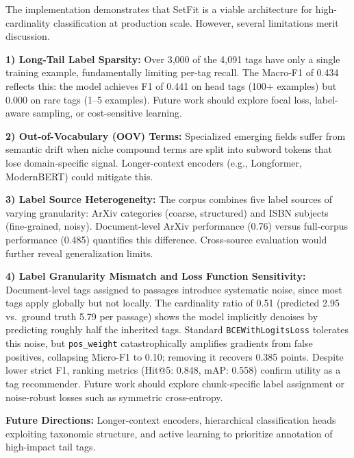 \documentclass[10pt,journal,compsoc]{IEEEtran}
\newcommand{\NumTags}{4,091}
\newcommand{\MicroF}{0.485}
\newcommand{\MacroF}{0.434}
\newcommand{\ArXivMicroF}{0.76}
\newcommand{\PosWeightMicroF}{0.10}
\newcommand{\PosWeightDelta}{0.385}
\newcommand{\HitRateFive}{0.848}
\newcommand{\MAPScore}{0.558}
\newcommand{\BucketHead}{0.441}
\newcommand{\BucketRare}{0.000}
\newcommand{\PredCardinality}{2.95}
\newcommand{\GTCardinality}{5.79}
\newcommand{\CardinalityRatio}{0.51}
\begin{document}
	The implementation demonstrates that SetFit is a viable architecture for high-cardinality classification at production scale. However, several limitations merit discussion.
	
	\textbf{1) Long-Tail Label Sparsity:} 
	Over 3,000 of the \NumTags{} tags have only a single training example, fundamentally limiting per-tag recall. The Macro-F1 of \MacroF{} reflects this: the model achieves F1 of \BucketHead{} on head tags (100+ examples) but \BucketRare{} on rare tags (1–5 examples). Future work should explore focal loss, label-aware sampling, or cost-sensitive learning.
	
	\textbf{2) Out-of-Vocabulary (OOV) Terms:} 
	Specialized emerging fields suffer from semantic drift when niche compound terms are split into subword tokens that lose domain-specific signal. Longer-context encoders (e.g., Longformer, ModernBERT) could mitigate this.
	
	\textbf{3) Label Source Heterogeneity:} 
	The corpus combines five label sources of varying granularity: ArXiv categories (coarse, structured) and ISBN subjects (fine-grained, noisy). Document-level ArXiv performance (\ArXivMicroF{}) versus full-corpus performance (\MicroF{}) quantifies this difference. Cross-source evaluation would further reveal generalization limits.
	
\textbf{4) Label Granularity Mismatch and Loss Function Sensitivity:} 
Document-level tags assigned to passages introduce systematic noise, since most tags apply globally but not locally. The cardinality ratio of \CardinalityRatio{} (predicted \PredCardinality{} vs.\ ground truth \GTCardinality{} per passage) shows the model implicitly denoises by predicting roughly half the inherited tags. Standard \texttt{BCEWithLogitsLoss} tolerates this noise, but \texttt{pos\_weight} catastrophically amplifies gradients from false positives, collapsing Micro-F1 to \PosWeightMicroF{}; removing it recovers \PosWeightDelta{} points. Despite lower strict F1, ranking metrics (Hit@5: \HitRateFive{}, mAP: \MAPScore{}) confirm utility as a tag recommender. Future work should explore chunk-specific label assignment or noise-robust losses such as symmetric cross-entropy.
	
	\textbf{Future Directions:} Longer-context encoders, hierarchical classification heads exploiting taxonomic structure, and active learning to prioritize annotation of high-impact tail tags.
	
\end{document}
